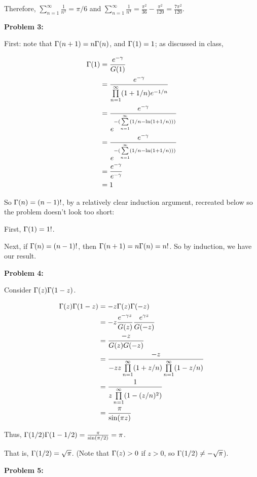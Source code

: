 \documentclass[a4paper,12pt]{article}
\begin{document}
Therefore, $\sum\limits_{n=1}^\infty \frac{1}{n^2} = \pi/6$ and $\sum\limits_{n=1}^\infty \frac{1}{n^4} = \frac{\pi^2}{36} - \frac{\pi^2}{120} = \frac{7\pi^2}{120}$.

\shunt

{\bf Problem 3:}

First: note that $\Gamma(n+1) = n\Gamma(n)$, and $\Gamma(1) = 1$; as discussed in class, 

\begin{align*}
\Gamma(1) &= \frac{e^{-\gamma}}{G(1)}\\
&= \frac{e^{-\gamma}}{\prod\limits_{n=1}^\infty (1+1/n)e^{-1/n}}\\
&= \frac{e^{-\gamma}}{e^{-(\sum\limits_{n=1}^\infty (1/n - \ln(1+1/n)))}}\\
&= \frac{e^{-\gamma}}{e^{-(\sum\limits_{n=1}^\infty (1/n - \ln(1+1/n)))}}\\
&= \frac{e^{-\gamma}}{e^{-\gamma}}\\
&= 1
\end{align*} %

So $\Gamma(n) = (n-1)!$, by a relatively clear induction argument, recreated below so the problem doesn't look too short:

First, $\Gamma(1) = 1!$.

Next, if $\Gamma(n) = (n-1)!$, then $\Gamma(n+1) = n\Gamma(n) = n!$. So by induction, we have our result.

\shunt

{\bf Problem 4:}

Consider $\Gamma(z)\Gamma(1-z)$.

\begin{align*}
\Gamma(z)\Gamma(1-z) &= -z\Gamma(z)\Gamma(-z)\\
&=-z\frac{e^{-\gamma z}}{G(z)} \frac{e^{\gamma z}}{G(-z)}\\
&=\frac{-z}{G(z)G(-z)}\\
&=\frac{-z}{-z z \prod\limits_{n=1}^\infty (1+z/n) \prod\limits_{n=1}^\infty (1-z/n)}\\
&=\frac{1}{ z \prod\limits_{n=1}^\infty (1-(z/n)^2)}\\
&= \frac{\pi}{\sin(\pi z)}
\end{align*}

Thus, $\Gamma(1/2)\Gamma(1-1/2) = \frac{\pi}{\sin(\pi/2)} = \pi$.

That is, $\Gamma(1/2) = \sqrt{\pi}$. (Note that $\Gamma(z) > 0$ if $z >0$, so $\Gamma(1/2) \neq - \sqrt{\pi}$).

\shunt

{\bf Problem 5:}
\end{document}
